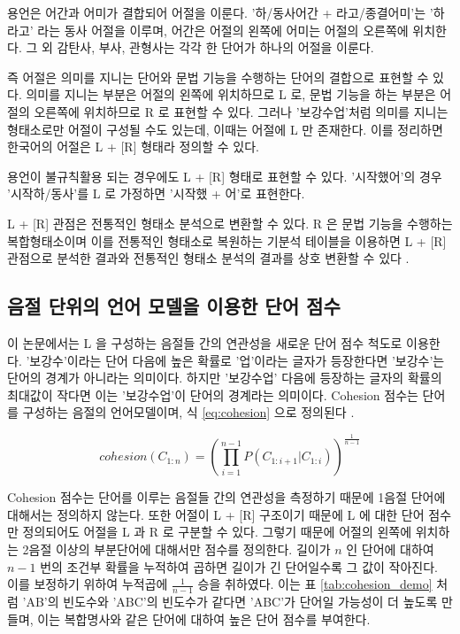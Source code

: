 \documentclass[oneside, ko,phd]{snuthesis_utf8_kor}
\begin{document}
용언은 어간과 어미가 결합되어 어절을 이룬다.
'하/동사어간 + 라고/종결어미'는 '하라고' 라는 동사 어절을 이루며, 어간은 어절의 왼쪽에 어미는 어절의 오른쪽에 위치한다.
그 외 감탄사, 부사, 관형사는 각각 한 단어가 하나의 어절을 이룬다.

즉 어절은 의미를 지니는 단어와 문법 기능을 수행하는 단어의 결합으로 표현할 수 있다.
의미를 지니는 부분은 어절의 왼쪽에 위치하므로 L 로, 문법 기능을 하는 부분은 어절의 오른쪽에 위치하므로 R 로 표현할 수 있다.
그러나 '보강수업'처럼 의미를 지니는 형태소로만 어절이 구성될 수도 있는데, 이때는 어절에 L 만 존재한다.
이를 정리하면 한국어의 어절은 L + [R] 형태라 정의할 수 있다.

용언이 불규칙활용 되는 경우에도 L + [R] 형태로 표현할 수 있다.
'시작했어'의 경우 '시작하/동사'를 L 로 가정하면 '시작했 + 어'로 표현한다.

L + [R] 관점은 전통적인 형태소 분석으로 변환할 수 있다.
R 은 문법 기능을 수행하는 복합형태소이며 이를 전통적인 형태소로 복원하는 기분석 테이블을 이용하면 L + [R] 관점으로 분석한 결과와 전통적인 형태소 분석의 결과를 상호 변환할 수 있다 \cite{shim2013syllable}.

\subsection{음절 단위의 언어 모델을 이용한 단어 점수}
이 논문에서는 L 을 구성하는 음절들 간의 연관성을 새로운 단어 점수 척도로 이용한다.
'보강수'이라는 단어 다음에 높은 확률로 '업'이라는 글자가 등장한다면 '보강수'는 단어의 경계가 아니라는 의미이다.
하지만 '보강수업' 다음에 등장하는 글자의 확률의 최대값이 작다면 이는 '보강수업'이 단어의 경계라는 의미이다.
Cohesion 점수는 단어를 구성하는 음절의 언어모델이며, 식 \ref{eq:cohesion} 으로 정의된다 \cite{kim2013cleansing}.

\begin{equation}
\label{eq:cohesion}
cohesion(C_{1:n}) = \left( \prod_{i=1}^{n-1} P(C_{1:i+1} \vert C_{1:i}) \right) ^ {\frac{1}{n-1}} 
\end{equation}

Cohesion 점수는 단어를 이루는 음절들 간의 연관성을 측정하기 때문에 1음절 단어에 대해서는 정의하지 않는다.
또한 어절이 L + [R] 구조이기 때문에 L 에 대한 단어 점수만 정의되어도 어절을 L 과 R 로 구분할 수 있다.
그렇기 때문에 어절의 왼쪽에 위치하는 2음절 이상의 부분단어에 대해서만 점수를 정의한다.
길이가 $n$ 인 단어에 대하여 $n-1$ 번의 조건부 확률을 누적하여 곱하면 길이가 긴 단어일수록 그 값이 작아진다.
이를 보정하기 위하여 누적곱에 $\frac{1}{n-1}$ 승을 취하였다.
이는 표 \ref{tab:cohesion_demo} 처럼 'AB'의 빈도수와 'ABC'의 빈도수가 같다면 'ABC'가 단어일 가능성이 더 높도록 만들며, 이는 복합명사와 같은 단어에 대하여 높은 단어 점수를 부여한다.
\end{document}
